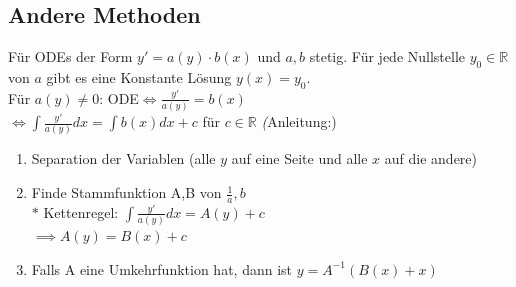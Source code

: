 \subsection{Andere Methoden}
  Für ODEs der Form $y'=a(y)\cdot b(x)$ und $a,b$ stetig.
  Für jede Nullstelle $y_0\in\mathbb R$ von $a$ gibt es eine Konstante Lösung
  $y(x)=y_0$.\\
  Für $a(y)\neq0$: ODE$\iff \frac{y'}{a(y)}=b(x)$\\
  $\iff\int \frac{y'}{a(y)}dx=\int b(x)dx+c$ für $c\in\mathbb R$
  \textit(Anleitung:)
  \begin{enumerate}
    \item Separation der Variablen (alle $y$ auf eine Seite und alle $x$ auf die andere)
    \item Finde Stammfunktion A,B von $\frac{1}{a}, b$\\
    $*$ Kettenregel: $\int\frac{y'}{a(y)}dx = A(y)+c$\\
    $\implies A(y)=B(x) + c$
    \item Falls A eine Umkehrfunktion hat, dann ist $y=A^{-1}(B(x)+x)$
  \end{enumerate}

